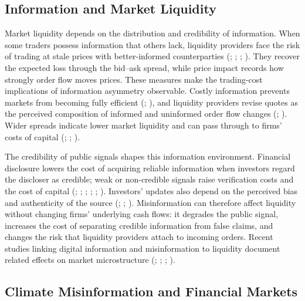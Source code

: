 \documentclass{article}
\theoremstyle{plain}
\begin{document}
\subsection{Information and Market Liquidity}

Market liquidity depends on the distribution and credibility of information. When some traders possess information that others lack, liquidity providers face the risk of trading at stale prices with better-informed counterparties (\cite{Akerlof1970}; \cite{GlostenMilgrom1985}; \cite{EasleyOHara1992}; \cite{Kyle1985}). They recover the expected loss through the bid--ask spread, while price impact records how strongly order flow moves prices. These measures make the trading-cost implications of information asymmetry observable. Costly information prevents markets from becoming fully efficient (\cite{GrossmanStiglitz1980}; \cite{Stiglitz2000}), and liquidity providers revise quotes as the perceived composition of informed and uninformed order flow changes (\cite{Hasbrouck1991}; \cite{easley1996}). Wider spreads indicate lower market liquidity and can pass through to firms' costs of capital (\cite{Tse2024}; \cite{Aliyev2025}; \cite{Aquilina2025}).

The credibility of public signals shapes this information environment. Financial disclosure lowers the cost of acquiring reliable information when investors regard the discloser as credible; weak or non-credible signals raise verification costs and the cost of capital (\cite{DiamondVerrecchia1991}; \cite{Verrecchia2001}; \cite{healy2001information}; \cite{LeuzVerrecchia2000}; \cite{BushmanSmith2001}; \cite{GoldsteinYang2017}). Investors' updates also depend on the perceived bias and authenticity of the source (\cite{Dye1985}; \cite{Cologna2022ValueJudgements}; \cite{KorehMandelkern2024}). Misinformation can therefore affect liquidity without changing firms' underlying cash flows: it degrades the public signal, increases the cost of separating credible information from false claims, and changes the risk that liquidity providers attach to incoming orders. Recent studies linking digital information and misinformation to liquidity document related effects on market microstructure (\cite{HerzingMuck2025}; \cite{DeesOzyurtMiller2026}; \cite{Mo2026ClimateRiskDisclosureMispricing}; \cite{LEIPPOLD202264}).

\subsection{Climate Misinformation and Financial Markets}
\end{document}
